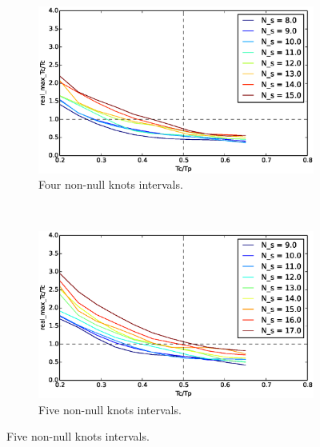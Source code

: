 \begin{figure}
        \centering
        ~ %
        \begin{subfigure}[b]{0.48\textwidth}
                \includegraphics[width=\textwidth]{./img/realtime/Scenario_6__N_knots_4/uni.eps}
                \caption{Four non-null knots intervals.}\label{fig:uni64}
        \end{subfigure}
        ~ %
        \begin{subfigure}[b]{0.48\textwidth}
                \includegraphics[width=\textwidth]{./img/realtime/Scenario_6__N_knots_5/uni.eps}
                \caption{Five non-null knots intervals.}\label{fig:uni65}
        \end{subfigure}
        

\end{figure}
